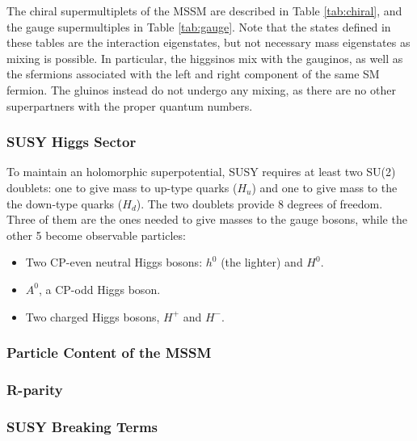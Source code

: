 The chiral supermultiplets of the MSSM are described in Table \ref{tab:chiral}, and the gauge supermultiples in Table \ref{tab:gauge}. Note that the states defined in these tables are the interaction eigenstates, but not necessary mass eigenstates as mixing is possible. In particular, the higgsinos mix with the gauginos, as well as the sfermions associated with the left and right component of the same SM fermion. The gluinos instead do not undergo any mixing, as there are no other superpartners with the proper quantum numbers.


\subsubsection{SUSY Higgs Sector}
\label{sec:susy:higgs}

To maintain an holomorphic superpotential, SUSY requires at least two SU(2) doublets: one to give mass to up-type quarks ($H_u$) and one to give mass to the the down-type quarks ($H_d$). The two doublets provide 8 degrees of freedom. Three of them are the ones needed to give masses to the gauge bosons, while the other 5 become observable particles:
\begin{itemize}
\item Two CP-even neutral Higgs bosons: $h^0$ (the lighter) and $H^0$.
\item $A^0$, a CP-odd Higgs boson.
\item Two charged Higgs bosons, $H^+$ and $H^-$.
\end{itemize}


\subsubsection{Particle Content of the MSSM}

\subsubsection{R-parity}

\subsubsection{SUSY Breaking Terms}


